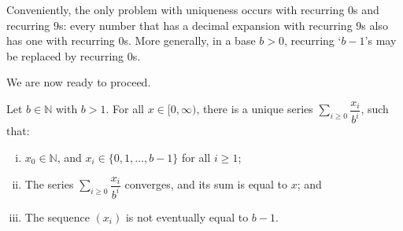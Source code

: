 Conveniently, the only problem with uniqueness occurs with recurring $0$s and recurring $9$s: every number that has a decimal expansion with recurring $9$s also has one with recurring $0$s. More generally, in a base $b>0$, recurring `$b-1$'s may be replaced by recurring $0$s.

We are now ready to proceed.

\begin{theorem}
\label{thmBaseBExpansionsOfReals}
Let $b \in \mathbb{N}$ with $b > 1$. For all $x \in [0,\infty)$, there is a unique series $\displaystyle \sum_{i \ge 0} \dfrac{x_i}{b^i}$, such that:
\begin{enumerate}[(i)]
\item $x_0 \in \mathbb{N}$, and $x_i \in \{ 0, 1, \dots, b-1 \}$ for all $i \ge 1$;
\item The series $\displaystyle \sum_{i \ge 0} \dfrac{x_i}{b^i}$ converges, and its sum is equal to $x$; and
\item The sequence $(x_i)$ is not eventually equal to $b-1$.
\end{enumerate}
\end{theorem}

